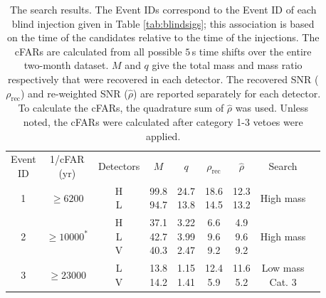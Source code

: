 \begin{table}
\caption{\label{tab:ihopeEvents}The \ihope{} search results. The Event IDs
correspond to the Event ID of each blind injection given in Table
\ref{tab:blindsigs}; this association is based on the time of the candidates
relative to the time of the injections. The cFARs are
calculated from all possible $5\,$s time shifts over the entire two-month 
dataset. $M$ and $q$ give the total mass and mass ratio 
respectively that were recovered in each detector. The
recovered SNR ($\rho_{\mathrm{rec}}$) and re-weighted SNR ($\hat{\rho}$) are
reported separately for each detector. To calculate the cFARs, the quadrature
sum of $\hat{\rho}$ was used. Unless noted, the cFARs were calculated after
category 1-3 vetoes were applied.}
\begin{tabular}{@{}ccccccccc}
    \subrows{Event\\ID} & \subrows{1/cFAR\\(yr)} & Detectors & $M$ & 
$q$ & $\rho_{\mathrm{rec}}$ & $\hat{\rho}$ & 
Search \\
    1 & $\geq 6200$ & \subrows{H\\L} & \subrows{99.8\\94.7} & 
\subrows{24.7\\13.8} & \subrows{18.6\\14.5} & 
\subrows{12.3\\13.2} & High mass \\ 
    2 & $\geq 10000^*$ &  \subrows{H\\L\\V} & \subrows{37.1\\42.7\\40.3} & 
\subrows{3.22\\3.99\\2.47} &
\subrows{6.6\\9.6\\9.2} 
& \subrows{4.9\\9.6\\9.2} & High mass \\ 
    \multirow{2}{*}{3} & $\geq 23000$ & \subrows{L\\V} & \subrows{13.8\\14.2} & 
\subrows{1.15\\1.41} & \subrows{12.4\\5.9} & 
\subrows{11.6\\5.2} & \subrows{Low mass\\Cat. 3}\\ \cline{2-8}

\end{tabular}
\end{table}

